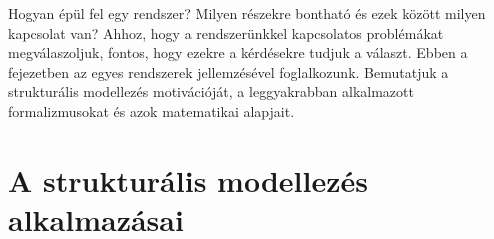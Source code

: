 
\graphicspath{ {./struktura-alapu-modellezes/figures/} }

\newcommand{\yedscale}{0.7}


%
%
%
%

Hogyan épül fel egy rendszer? Milyen részekre bontható és ezek között milyen kapcsolat van? Ahhoz, hogy a rendszerünkkel kapcsolatos problémákat megválaszoljuk, fontos, hogy ezekre a kérdésekre tudjuk a választ. Ebben a fejezetben az egyes rendszerek  jellemzésével foglalkozunk. Bemutatjuk a strukturális modellezés motivációját, a leggyakrabban alkalmazott formalizmusokat és azok matematikai alapjait.




\section{A strukturális modellezés alkalmazásai}
\label{sec:motivacio}

